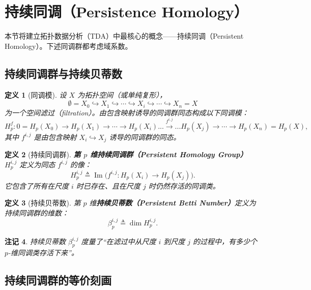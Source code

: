 \documentclass[UTF8]{ctexart}
\newtheorem{definition}{定义}[section]
\newtheorem{remark}[definition]{注记}
\begin{document}
\section{持续同调（Persistence Homology）}
\label{sec:persistence-homology}

本节将建立拓扑数据分析（TDA）中最核心的概念——持续同调（Persistent Homology）。下述同调群都考虑域系数。

\subsection{持续同调群与持续贝蒂数}
\label{subsec:persistent-homology-basics}

\begin{definition}[同调模]
\label{def:homology-module-sequence-pers}
设 \(X\) 为拓扑空间（或单纯复形），
\[
\emptyset = X_0 \hookrightarrow X_1 \hookrightarrow \cdots \hookrightarrow X_i \hookrightarrow \cdots \hookrightarrow X_n = X
\]
为一个空间滤过（filtration）。由包含映射诱导的同调群同态构成以下同调模：
\[
H_p^f: 0 = H_p(X_0) \to H_p(X_1) \to \cdots \to H_p(X_i) ...\xrightarrow{f^{i,j}}... H_p(X_j) \to \cdots \to H_p(X_n) = H_p(X),
\]
其中 \(f^{i,j}\) 是由包含映射 \(X_i \hookrightarrow X_j\) 诱导的同调群的同态。
\end{definition}

\begin{definition}[持续同调群]
\label{def:persistent-homology-group}
\textbf{第 \(p\) 维持续同调群（Persistent Homology Group）} \(H_p^{i,j}\) 定义为同态 \(f^{i,j}\) 的像：
\[
H_p^{i,j} \triangleq \operatorname{Im}\big(f^{i,j}: H_p(X_i) \to H_p(X_j)\big).
\]
它包含了所有在尺度 \(i\) 时已存在、且在尺度 \(j\) 时仍然存活的同调类。
\end{definition}

\begin{definition}[持续贝蒂数]
\label{def:persistent-betti}
第 \(p\) 维\textbf{持续贝蒂数（Persistent Betti Number）}定义为持续同调群的维数：
\[
\beta_p^{i,j} \triangleq \dim H_p^{i,j}.
\]
\end{definition}

\begin{remark}
持续贝蒂数 \(\beta_p^{i,j}\) 度量了“在滤过中从尺度 \(i\) 到尺度 \(j\) 的过程中，有多少个 \(p\)-维同调类存活下来”。
\end{remark}

\subsection{持续同调群的等价刻画}
\label{subsec:persistent-homology-characterization}
\end{document}
